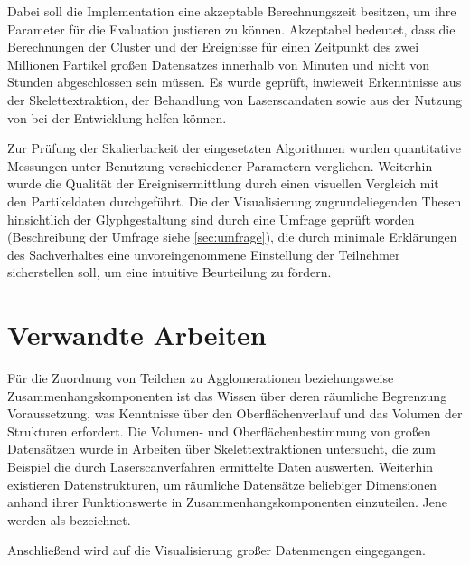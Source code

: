 Dabei soll die Implementation eine akzeptable Berechnungszeit besitzen, um ihre Parameter für die Evaluation justieren zu können. Akzeptabel bedeutet, dass die Berechnungen der Cluster und der Ereignisse für einen Zeitpunkt des zwei Millionen Partikel großen Datensatzes innerhalb von Minuten und nicht von Stunden abgeschlossen sein müssen. Es wurde geprüft, inwieweit Erkenntnisse aus der Skelettextraktion, der Behandlung von Laserscandaten sowie aus der Nutzung von  bei der Entwicklung helfen können.

Zur Prüfung der Skalierbarkeit der eingesetzten Algorithmen wurden quantitative Messungen unter Benutzung verschiedener Parametern verglichen. Weiterhin wurde die Qualität der Ereignisermittlung durch einen visuellen Vergleich mit den Partikeldaten durchgeführt. Die der Visualisierung zugrundeliegenden Thesen hinsichtlich der Glyphgestaltung sind durch eine Umfrage geprüft worden (Beschreibung der Umfrage siehe \autoref{sec:umfrage}), die durch minimale Erklärungen des Sachverhaltes eine unvoreingenommene Einstellung der Teilnehmer sicherstellen soll, um eine intuitive Beurteilung zu fördern.



\chapter{Verwandte Arbeiten}
Für die Zuordnung von Teilchen zu Agglomerationen beziehungsweise Zusammenhangskomponenten ist das Wissen über deren räumliche Begrenzung Voraussetzung, was Kenntnisse über den Oberflächenverlauf und das Volumen der Strukturen erfordert.
Die Volumen- und Oberflächenbestimmung von großen Datensätzen wurde in Arbeiten über Skelettextraktionen untersucht, die zum Beispiel die durch Laserscanverfahren ermittelte Daten auswerten. Weiterhin existieren Datenstrukturen, um räumliche Datensätze beliebiger Dimensionen anhand ihrer Funktionswerte in Zusammenhangskomponenten einzuteilen. Jene werden als  bezeichnet.

Anschließend wird auf die Visualisierung großer Datenmengen eingegangen.


